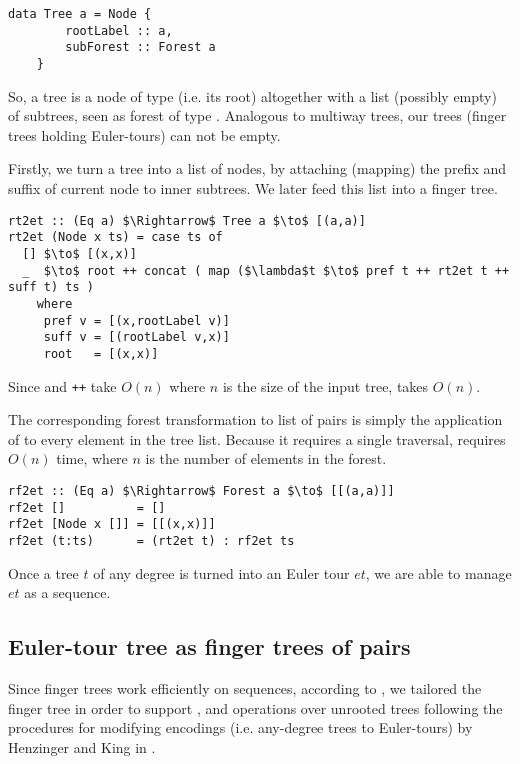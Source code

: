 \begin{lstlisting}
data Tree a = Node {
        rootLabel :: a,         
        subForest :: Forest a   
    }
\end{lstlisting}

So, a tree is a node of type  (i.e. its root) altogether with a list (possibly empty) of subtrees, seen as forest of type . Analogous to multiway trees, our trees (finger trees holding Euler-tours) can not be empty. 

Firstly, we turn a tree into a list of nodes, by attaching (mapping) the prefix and suffix of current node to inner subtrees. We later feed this list into a finger tree. 

\begin{lstlisting}[mathescape] 
rt2et :: (Eq a) $\Rightarrow$ Tree a $\to$ [(a,a)] 
rt2et (Node x ts) = case ts of
  [] $\to$ [(x,x)]
  _  $\to$ root ++ concat ( map ($\lambda$t $\to$ pref t ++ rt2et t ++ suff t) ts )   
    where
     pref v = [(x,rootLabel v)]
     suff v = [(rootLabel v,x)]
     root   = [(x,x)] 
\end{lstlisting} 

Since  and \texttt{++} take $O(n)$ where $n$ is the size of the input tree,  takes $O(n)$. 

The corresponding forest transformation to list of pairs is simply the application of  to every element in the tree list. Because it requires a single traversal,  requires $O(n)$ time, where $n$ is the number of elements in the forest.

\begin{lstlisting}[mathescape] 
rf2et :: (Eq a) $\Rightarrow$ Forest a $\to$ [[(a,a)]]
rf2et []          = []
rf2et [Node x []] = [[(x,x)]]  
rf2et (t:ts)      = (rt2et t) : rf2et ts
\end{lstlisting}

Once a tree $t$ of any degree is turned into an Euler tour $et$, we are able to manage $et$ as a sequence. 


\subsection{Euler-tour tree as finger trees of pairs}

Since finger trees work efficiently on sequences, according to \cite{FTs}, we tailored the finger tree in order to support \link, \cut and \connected operations over unrooted trees following the procedures for modifying encodings (i.e. any-degree trees to Euler-tours) by Henzinger and King in \cite{Rand-DynGs-Algos}.

